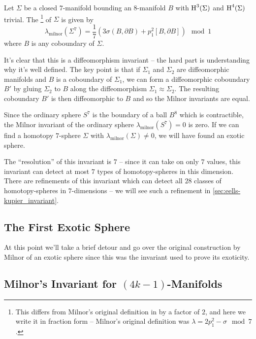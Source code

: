 \begin{definition}\label{defn:milnor_invariant_7}
	Let $\Sigma$ be a closed $7$-manifold bounding an $8$-manifold $B$ with $\operatorname{H}^3(\Sigma)$ and $\operatorname{H}^4(\Sigma)$ trivial.
	The \footnote{This differs from Milnor's original definition in \cite{milnor1956manifolds} by a factor of $2$, and here we write it in fraction form -- Milnor's original definition was $\lambda= 2p_1^2-\sigma\mod 7$.} of $\Sigma$ is given by
	\[
		\boxed{\lambda_{\mathrm{milnor}}(\Sigma^7) = \frac{1}{7}\left(3\sigma(B,\partial B)+p_1^2[B,\partial B]\right)\mod 1}
	\]
	where $B$ is any coboundary of $\Sigma$.
\end{definition}

It's clear that this is a diffeomorphism invariant -- the hard part is understanding why it's well defined. The key point is that if $\Sigma_1$ and $\Sigma_2$ are diffeomorphic manifolds and $B$ is a coboundary of $\Sigma_1$, we can form a diffeomorphic coboundary $B'$ by gluing $\Sigma_2$ to $B$ along the diffeomorphism $\Sigma_1\approx\Sigma_2$. The resulting coboundary $B'$ is then diffeomorphic to $B$ and so the Milnor invariants are equal.

Since the ordinary sphere $S^7$ is the boundary of a ball $B^8$ which is contractible, the Milnor invariant of the ordinary sphere $\lambda_{\textrm{milnor}}(S^7)=0$ is zero.
If we can find a homotopy $7$-sphere $\Sigma$ with $\lambda_{\textrm{milnor}}(\Sigma)\neq 0$, we will have found an exotic sphere.

\begin{remark} The ``resolution'' of this invariant is $7$ -- since it can take on only $7$ values, this invariant can detect at most $7$ types of homotopy-spheres in this dimension. There are refinements of this invariant which can detect all $28$ classes of homotopy-spheres in $7$-dimensions -- we will see such a refinement in \cref{sec:eells-kupier_invariant}.\end{remark}

\subsection*{The First Exotic Sphere}

At this point we'll take a brief detour and go over the original construction by Milnor of an exotic sphere since this was the invariant used to prove its exoticity.


\subsection*{Milnor's Invariant for $(4k-1)$-Manifolds}

